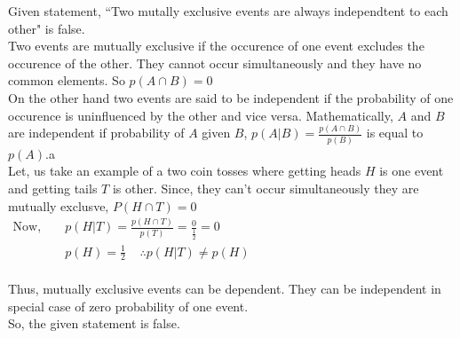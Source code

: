 \documentclass{article}
\begin{document}
\Large{
    Given statement, ``Two mutally exclusive events are always independtent to each other" is false.\\

    Two events are mutually exclusive if the occurence of one event excludes the occurence of the other. They cannot occur simultaneously and they have no common elements. So $p(A\cap B) = 0$\\

    On the other hand two events are said to be independent if the probability of one occurence is uninfluenced by the other and vice versa.
    Mathematically, $A$ and $B$ are independent if probability of $A$ given $B$, $p(A|B) = \frac{p(A\cap B)}{p(B)}$ is equal to $p(A)$.a\\

    Let, us take an example of a two coin tosses where getting heads $H$ is one event and getting tails $T$ is other. Since, they can't occur simultaneously they are mutually exclusve, $P(H \cap T) = 0$\\

    \begin{eqnarray*}
        \text{Now, } &&p(H|T) = \frac{p(H\cap T)}{p(T)} = \frac{0}{\frac{1}{2}} = 0\hspace{10cm}\\
        &&p(H) = \frac{1}{2}\;\;\;\; \therefore p(H|T) \neq p(H)
    \end{eqnarray*}
    \\
    Thus, mutually exclusive events can be dependent. They can be independent in special case of zero probability of one event.\\

    So, the given statement is false.
}
\end{document}
